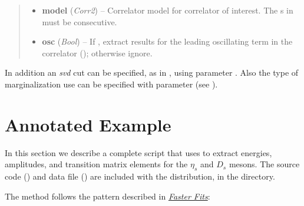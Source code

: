 \documentclass[letterpaper,10pt,english]{sphinxmanual}
\begin{document}
\begin{fulllineitems}
\begin{quote}
\begin{description}
\begin{itemize}
\item {} 
\textbf{model} (\emph{Corr2}) -- Correlator model for correlator of interest. The s
in  must be consecutive.

\item {} 
\textbf{osc} (\emph{Bool}) -- If , extract results for the leading oscillating
term in the correlator (); otherwise ignore.

\end{itemize}

\end{description}\end{quote}

In addition an \emph{svd} cut can be specified, as in {\hyperref[corrfitter:corrfitter.CorrFitter]{}}, using
parameter . Also the type of marginalization
use can be specified with parameter  (see {\hyperref[corrfitter:corrfitter.CorrFitter]{}}).

\end{fulllineitems}



\section{Annotated Example}
\label{corrfitter:annotated-example}\label{corrfitter:id2}
In this section we describe a complete script that uses  to
extract energies, amplitudes, and transition matrix elements for  the
\(\eta_s\) and \(D_s\) mesons. The source code () and
data file () are included with the 
distribution, in the  directory.

The  method follows the pattern described in {\hyperref[corrfitter:faster-fits]{\emph{Faster Fits}}}:
\end{document}
